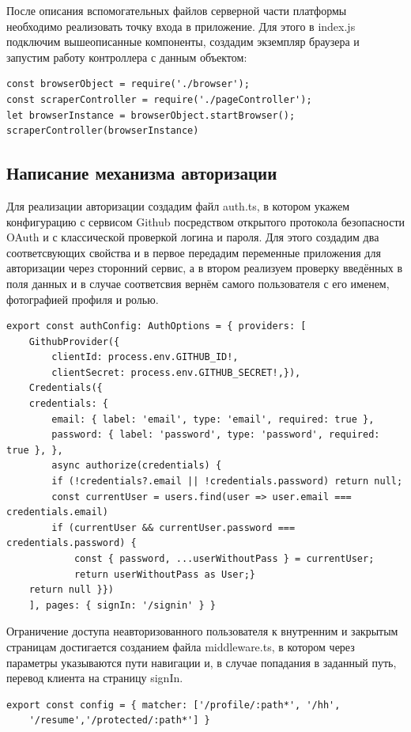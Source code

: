 \documentclass[master, och, diploma]{SCWorks}
\begin{document}
После описания вспомогательных файлов серверной части платформы необходимо реализовать точку входа в приложение. Для этого в index.js подключим вышеописанные компоненты, создадим экземпляр браузера и запустим работу контроллера с данным объектом:
\begin{verbatim}
const browserObject = require('./browser');
const scraperController = require('./pageController');
let browserInstance = browserObject.startBrowser();
scraperController(browserInstance)
\end{verbatim}



\subsection{Написание механизма авторизации}
Для реализации авторизации создадим файл auth.ts, в котором укажем конфигурацию с сервисом Github посредством открытого протокола безопасности OAuth и с классической проверкой логина и пароля. Для этого создадим два соответсвующих свойства и в первое передадим переменные приложения для авторизации через сторонний сервис, а в втором реализуем проверку введённых в поля данных и в случае соответсвия вернём самого пользователя с его именем, фотографией профиля и ролью\cite{Fain_2022}.
\begin{verbatim}
export const authConfig: AuthOptions = { providers: [
    GithubProvider({
        clientId: process.env.GITHUB_ID!,
        clientSecret: process.env.GITHUB_SECRET!,}),
    Credentials({
    credentials: {
        email: { label: 'email', type: 'email', required: true },
        password: { label: 'password', type: 'password', required: true }, },
        async authorize(credentials) {
        if (!credentials?.email || !credentials.password) return null;
        const currentUser = users.find(user => user.email === credentials.email)
        if (currentUser && currentUser.password === credentials.password) {
            const { password, ...userWithoutPass } = currentUser;
            return userWithoutPass as User;}
    return null }})
    ], pages: { signIn: '/signin' } }
\end{verbatim}

Ограничение доступа неавторизованного пользователя к внутренним и закрытым страницам достигается созданием файла middleware.ts, в котором через параметры указываются пути навигации и, в случае попадания в заданный путь, перевод клиента на страницу signIn.
\begin{verbatim}
export const config = { matcher: ['/profile/:path*', '/hh', 
    '/resume','/protected/:path*'] }
\end{verbatim}
\end{document}
